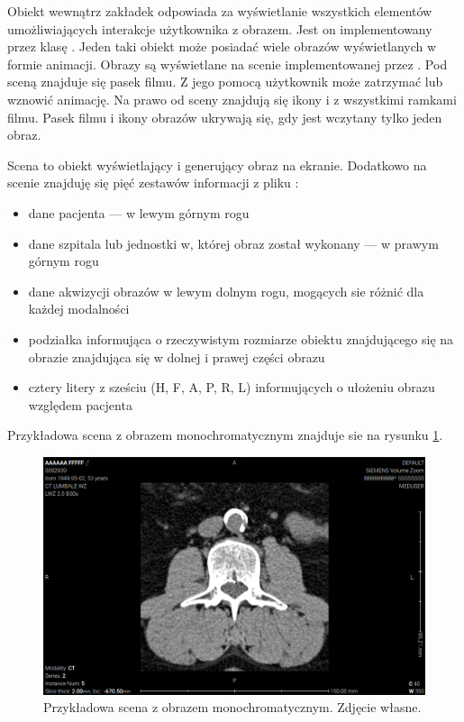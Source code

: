 \par
Obiekt wewnątrz zakładek odpowiada za wyświetlanie wszystkich elementów umożliwiających interakcje użytkownika z obrazem.
Jest on implementowany przez klasę .
Jeden taki obiekt może posiadać wiele obrazów wyświetlanych w formie animacji.
Obrazy są wyświetlane na scenie implementowanej przez .
Pod sceną znajduje się pasek filmu.
Z jego pomocą użytkownik może zatrzymać lub wznowić animację.
Na prawo od sceny znajdują się ikony i z wszystkimi ramkami filmu.
Pasek filmu i ikony obrazów ukrywają się, gdy jest wczytany tylko jeden obraz.
\par
Scena to obiekt wyświetlający i generujący obraz na ekranie.
Dodatkowo na scenie znajduję się pięć zestawów informacji z pliku \DICOM:
\begin{itemize}
    \item dane pacjenta --- w lewym górnym rogu
    \item dane szpitala lub jednostki w, której obraz został wykonany --- w prawym górnym rogu
    \item dane akwizycji obrazów w lewym dolnym rogu, mogących sie różnić dla każdej modalności
    \item podziałka informująca o rzeczywistym rozmiarze obiektu znajdującego się na obrazie znajdująca się w dolnej i prawej części obrazu
    \item cztery litery z sześciu (H, F, A, P, R, L) informujących o ułożeniu obrazu względem pacjenta
\end{itemize}
Przykładowa scena z obrazem monochromatycznym znajduje sie na rysunku \ref{fig:sokar-gui-scene}.

\begin{figure}[!htbp]
    \centering
    \includegraphics[width=\textwidth]{img/sokar-gui-003.png}
    \caption{Przykładowa scena z obrazem monochromatycznym. Zdjęcie własne.}
    \label{fig:sokar-gui-scene}
\end{figure}

